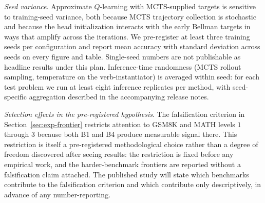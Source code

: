 \textit{Seed variance}. Approximate $Q$-learning with MCTS-supplied
targets is sensitive to training-seed variance, both because MCTS
trajectory collection is stochastic and because the head initialization
interacts with the early Bellman targets in ways that amplify across
the iterations. We pre-register at least three training seeds per
configuration and report mean accuracy with standard deviation across
seeds on every figure and table. Single-seed numbers are not
publishable as headline results under this plan. Inference-time
randomness (MCTS rollout sampling, temperature on the verb-instantiator)
is averaged within seed: for each test problem we run at least eight
inference replicates per method, with seed-specific aggregation
described in the accompanying release notes.

\textit{Selection effects in the pre-registered hypothesis}. The
falsification criterion in Section~\ref{sec:exp-frontier} restricts
attention to GSM8K and MATH levels $1$ through $3$ because both B1 and
B4 produce measurable signal there. This restriction is itself a
pre-registered methodological choice rather than a degree of freedom
discovered after seeing results: the restriction is fixed before any
empirical work, and the harder-benchmark frontiers are reported
without a falsification claim attached. The published study will state
which benchmarks contribute to the falsification criterion and which
contribute only descriptively, in advance of any number-reporting.
